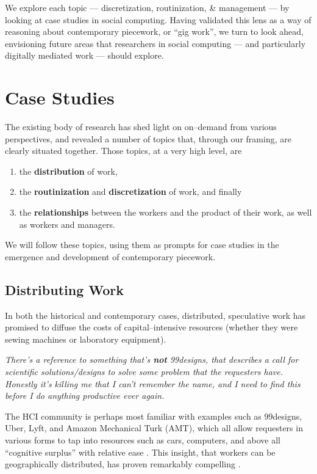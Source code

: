 \documentclass{sigchi}
\begin{document}
We explore each topic
--- discretization, routinization, \& management ---
by looking at case studies in social computing.
Having validated this lens as a way of reasoning about contemporary piecework, or ``gig work'',
we turn to look ahead, envisioning future areas that researchers in social computing
--- and particularly digitally mediated work ---
should explore.

\section{Case Studies}
The existing body of research has shed light on on--demand from various perspectives,
and revealed a number of topics that,
through our framing, are clearly situated together.
Those topics, at a very high level, are
\begin{enumerate}
\item the \textbf{distribution} of work,
\item the \textbf{routinization} and \textbf{discretization} of work, and finally
\item the \textbf{relationships} between the workers and the product of their work,
      as well as workers and managers.
\end{enumerate}

We will follow these topics, using them as prompts for case studies in
the emergence and
development of contemporary piecework.

\subsection{Distributing Work}
In both the historical and contemporary cases,
distributed, speculative work
has promised
to diffuse the costs of capital--intensive resources
(whether they were sewing machines or laboratory equipment).

\textit{There's a reference to something that's \textbf{not} 99designs,
that describes a call for scientific solutions/designs to solve some problem
that the requesters have.
Honestly it's killing me that I can't remember the name,
and I need to find this before I do anything productive ever again.}

The HCI community is perhaps most familiar with examples such as
99designs,
Uber, Lyft,
and Amazon Mechanical Turk (AMT),
which all allow requesters in various forms to tap into
resources such as
cars,
computers, and above all
``cognitive surplus''
with relative ease
\cite{DillahuntPromise,storiesIraniSilberman,shirky2010cognitive}.
This insight, that
workers can be geographically distributed,
has proven remarkably compelling
\cite{sensitiveTasks}.
\end{document}

